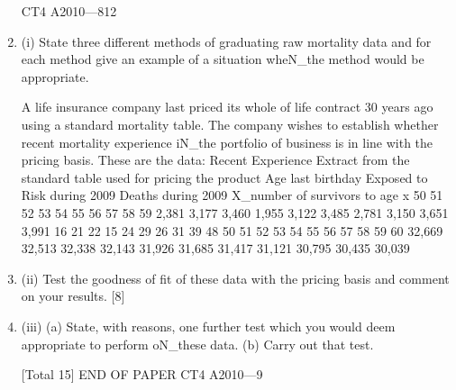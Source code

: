 \documentclass[a4paper,12pt]{article}
\begin{document}
\begin{enumerate}
CT4 A2010—812
\item (i)
State three different methods of graduating raw mortality data and
for each method give an example of a situation wheN_the method would be
appropriate.
 
A life insurance company last priced its whole of life contract 30 years ago using a
standard mortality table. The company wishes to establish whether recent mortality
experience iN_the portfolio of business is in line with the pricing basis. These are the
data:
Recent Experience
Extract from the standard table
used for pricing the product
Age last
birthday Exposed to
Risk during
2009 Deaths during
2009 X_number of
survivors to age
x
50
51
52
53
54
55
56
57
58
59 2,381
3,177
3,460
1,955
3,122
3,485
2,781
3,150
3,651
3,991 16
21
22
15
24
29
26
31
39
48 50
51
52
53
54
55
56
57
58
59
60 32,669
32,513
32,338
32,143
31,926
31,685
31,417
31,121
30,795
30,435
30,039
\item (ii) Test the goodness of fit of these data with the pricing basis and comment on
your results.
[8]
\item (iii) (a)
State, with reasons, one further test which you would deem appropriate
to perform oN_these data.
(b)
Carry out that test.

[Total 15]
END OF PAPER
CT4 A2010—9


\end{enumerate}
\end{document}
